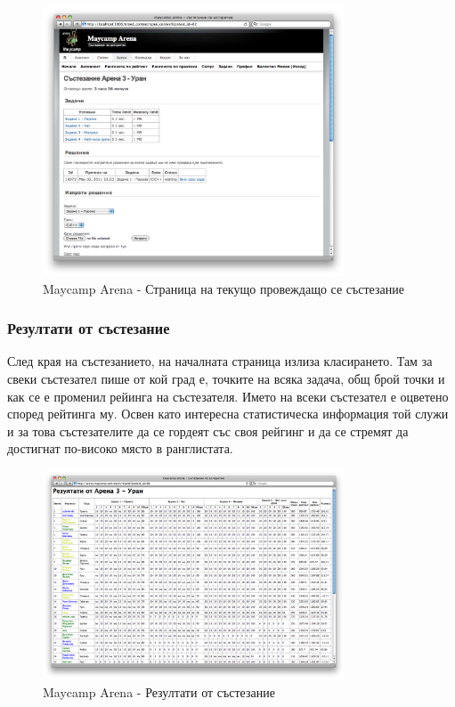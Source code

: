 \documentclass[a4paper,12pt]{article}
\begin{document}
  \begin{figure}[ht]
    \begin{center}
      \includegraphics[width=0.8\textwidth]{maycamp_arena_contest.png}
    \end{center}
    \caption{Maycamp Arena - Страница на текущо провеждащо се състезание}
    \label{arena_contest_page}
  \end{figure}
  
  \subsubsection{Резултати от състезание}
  
  След края на състезанието, на началната страница излиза класирането. Там за свеки състезател пише от кой град е, точките на всяка задача, общ брой точки и как се е променил рейинга на състезателя. Името на всеки състезател е оцветено според рейтинга му. Освен като интересна статистическа информация той служи и за това състезателите да се гордеят със своя рейгинг и да се стремят да достигнат по-високо място в ранглистата.

  \begin{figure}[ht]
    \begin{center}
      \includegraphics[width=0.8\textwidth]{maycamp_arena_results.png}
    \end{center}
    \caption{Maycamp Arena - Резултати от състезание}
    \label{arena_results}
  \end{figure}
\end{document}
